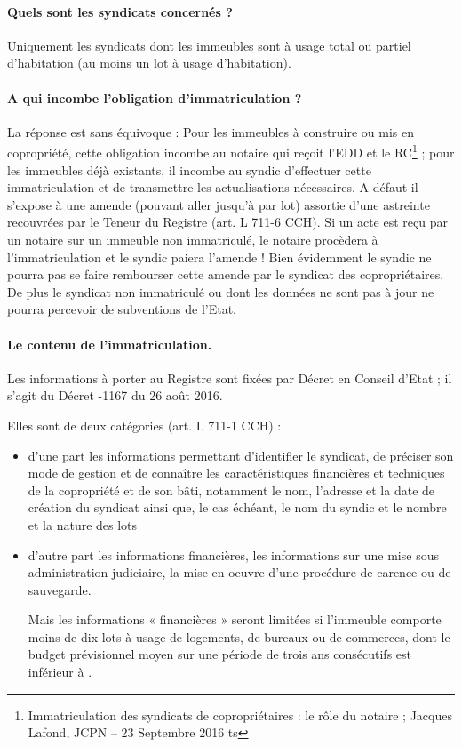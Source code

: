 			\paragraph{Quels sont les syndicats concernés ?}
			
				Uniquement les syndicats dont les immeubles sont à usage total ou partiel d’habitation (au moins un lot à usage d’habitation).
			
			\paragraph{A qui incombe l’obligation d’immatriculation ?}
				
				La réponse est sans équivoque : Pour les immeubles à construire ou mis en copropriété, cette obligation incombe au notaire qui reçoit l’EDD et le RC\footnote{
					Immatriculation des syndicats de copropriétaires : le rôle du notaire ; Jacques Lafond, JCPN  – 23 Septembre 2016 ts
				} ; pour les immeubles déjà existants, il incombe au syndic d’effectuer cette immatriculation et de transmettre les actualisations nécessaires. A défaut il s’expose à une amende (pouvant aller jusqu’à  par lot) assortie d’une astreinte recouvrées par le Teneur du Registre (art. L 711-6 CCH). Si un acte est reçu par un notaire sur un immeuble non immatriculé, le notaire
				procèdera à l’immatriculation et le syndic paiera l’amende ! Bien évidemment le syndic ne pourra pas se faire rembourser cette amende par le syndicat des copropriétaires. De plus le syndicat non immatriculé ou dont les données ne sont pas à jour ne pourra percevoir de subventions de l’Etat.
				
			\paragraph{Le contenu de l’immatriculation.}
			
				Les informations à porter au Registre sont fixées par Décret en Conseil d’Etat ; il s’agit du Décret -1167 du 26 août 2016.
				
				Elles sont de deux catégories (art. L 711-1 CCH) :
				\begin{itemize}
					\item  d’une part les informations permettant d'identifier le syndicat, de préciser son mode de gestion et de connaître les caractéristiques financières et techniques de la copropriété et de son bâti, notamment le nom, l'adresse et la date de création du syndicat ainsi que, le cas échéant, le nom du syndic et le nombre et la nature des lots
					
					\item d’autre part les informations financières, les informations sur une mise sous administration judiciaire, la mise en oeuvre d’une procédure de carence ou de sauvegarde.
							
					Mais les informations « financières » seront limitées si l’immeuble comporte moins de dix lots à usage de logements, de bureaux ou de commerces, dont le budget prévisionnel moyen sur une période de trois ans consécutifs est inférieur à .
				\end{itemize}
			
